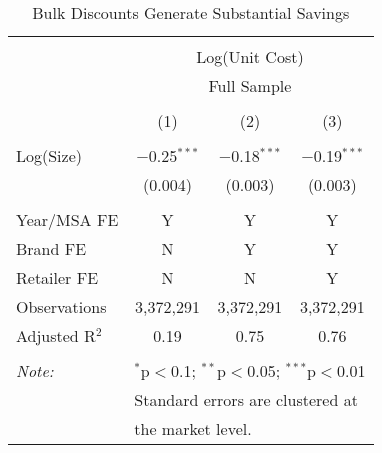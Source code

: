 
\begin{table}[!htbp] \centering 
  \caption{Bulk Discounts Generate Substantial Savings} 
  \label{tab:bulkDiscountUnitCost} 
\begin{tabular}{@{\extracolsep{5pt}}lccc} 
\\[-1.8ex]\hline 
\hline \\[-1.8ex] 
 & \multicolumn{3}{c}{Log(Unit Cost)} \\ 
\cline{2-4} 
 & \multicolumn{3}{c}{Full Sample} \\ 
\\[-1.8ex] & (1) & (2) & (3)\\ 
\hline \\[-1.8ex] 
 Log(Size) & $-$0.25$^{***}$ & $-$0.18$^{***}$ & $-$0.19$^{***}$ \\ 
  & (0.004) & (0.003) & (0.003) \\ 
 \hline \\[-1.8ex] 
Year/MSA FE & Y & Y & Y \\ 
Brand FE & N & Y & Y \\ 
Retailer FE & N & N & Y \\ 
Observations & 3,372,291 & 3,372,291 & 3,372,291 \\ 
Adjusted R$^{2}$ & 0.19 & 0.75 & 0.76 \\ 
\hline 
\hline \\[-1.8ex] 
\textit{Note:}  & \multicolumn{3}{l}{$^{*}$p$<$0.1; $^{**}$p$<$0.05; $^{***}$p$<$0.01} \\ 
 & \multicolumn{3}{l}{Standard errors are clustered at} \\ 
 & \multicolumn{3}{l}{the market level.} \\ 
\end{tabular} 
\end{table} 
